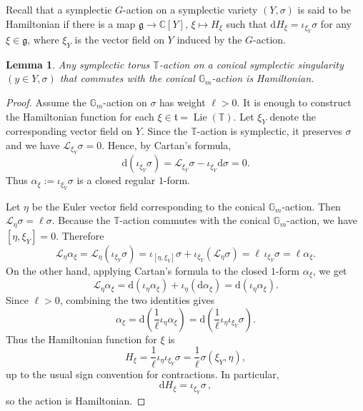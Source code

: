 \documentclass[12pt]{amsart}
\newtheorem{lem}[prop]{Lemma}
\theoremstyle{definition}
\newcommand{\bC}{\mathbb{C}}
\newcommand{\bT}{\mathbb{T}}
\newcommand{\bG}{\mathbb{G}}
\newcommand{\cL}{\mathcal{L}}
\newcommand{\fg}{\mathfrak g}
\newcommand{\rd}{\mathrm{d}}
\numberwithin{equation}{section}
\begin{document}
Recall that a symplectic $G$-action on a symplectic variety $(Y,\sigma)$ is said to be Hamiltonian if there is a map $\fg\to \bC[Y]$, $\xi\mapsto H_\xi$ such that $\rd H_\xi =\iota_{\xi_Y} \sigma$ for any $\xi\in \fg$, where $\xi_Y$ is the vector field on $Y$ induced by the $G$-action. 

\begin{lem}\label{l-Sym=Hamilton}
Any symplectic torus $\bT$-action on a conical symplectic singularity $(y\in Y,\sigma)$ that commutes with the conical $\bG_m$-action is Hamiltonian. 
\end{lem}
\begin{proof}
Assume the $\mathbb{G}_m$-action on $\sigma$ has weight $\ell>0$.
It is enough to construct the  Hamiltonian function for each
\(\xi\in\mathfrak t=\operatorname{Lie}(\mathbb T)\). Let $\xi_Y$ denote the corresponding vector field on $Y$. Since the $\mathbb T$-action is symplectic, it preserves $\sigma$ and we have $\mathcal L_{\xi_Y}\sigma=0$.
Hence, by Cartan's formula,
\[
\rd(\iota_{\xi_Y}\sigma)=\mathcal L_{\xi_Y}\sigma-\iota_{\xi_Y}\rd\sigma=0.
\]
Thus $\alpha_\xi:=\iota_{\xi_Y}\sigma$ is a closed regular \(1\)-form.

Let $\eta$ be the Euler vector field corresponding to the conical $\bG_m$-action. Then $\cL_{\eta}\sigma = \ell\sigma$. Because the $\mathbb T$-action commutes with the conical
\(\mathbb G_m\)-action, we have $ [\eta,\xi_Y]=0$. Therefore
\[
\mathcal L_\eta\alpha_\xi = \mathcal L_\eta(\iota_{\xi_Y}\sigma) = \iota_{[\eta,\xi_Y]}\sigma+\iota_{\xi_Y}(\mathcal L_\eta\sigma) = \ell\,\iota_{\xi_Y}\sigma =\ell\alpha_\xi .
\]
On the other hand, applying Cartan's formula to the closed \(1\)-form
\(\alpha_\xi\), we get
\[
\mathcal L_\eta\alpha_\xi
=
\rd(\iota_\eta \alpha_\xi)+\iota_\eta(\rd\alpha_\xi)
=
\rd(\iota_\eta\alpha_\xi).
\]
Since $\ell>0$, combining the two identities gives %
\[
\alpha_\xi
=
\rd\left(\frac{1}{\ell}\iota_\eta\alpha_\xi\right)
=
\rd\left(\frac{1}{\ell}\iota_\eta\iota_{\xi_Y}\sigma\right).
\]
Thus the Hamiltonian function for \(\xi\) is
\[
H_\xi
=
\frac{1}{\ell}\iota_\eta\iota_{\xi_Y}\sigma
=
\frac{1}{\ell}\sigma(\xi_Y,\eta),
\]
up to the usual sign convention for contractions. %
In particular,
\[
\rd H_\xi=\iota_{\xi_Y}\sigma \, ,
\]
so the action is Hamiltonian.
\end{proof}
\end{document}
